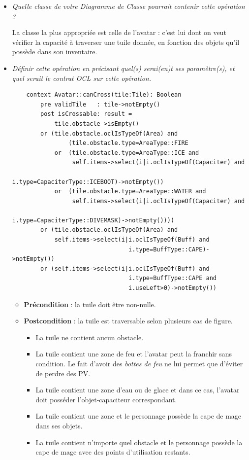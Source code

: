 \documentclass[oneside,a4paper]{book}
\begin{document}
\begin{itemize}
    \item \textit{Quelle classe de votre Diagramme de Classe pourrait contenir cette opération ?}
    
        La classe la plus appropriée est celle de l'avatar : c'est lui dont on veut vérifier la capacité à traverser une tuile donnée, en fonction des objets qu'il possède dans son inventaire.

    \item \textit{Définir cette opération en précisant quel(s) serai(en)t ses paramètre(s), et quel serait le contrat OCL sur cette opération.}

    \begin{minipage}{\linewidth}
    \begin{lstlisting}
    context Avatar::canCross(tile:Tile): Boolean
        pre validTile   : tile->notEmpty()
        post isCrossable: result = 
            tile.obstacle->isEmpty()
        or (tile.obstacle.oclIsTypeOf(Area) and
                (tile.obstacle.type=AreaType::FIRE
            or  (tile.obstacle.type=AreaType::ICE and
                 self.items->select(i|i.oclIsTypeOf(Capaciter) and
                                      i.type=CapaciterType::ICEBOOT)->notEmpty())
            or  (tile.obstacle.type=AreaType::WATER and
                 self.items->select(i|i.oclIsTypeOf(Capaciter) and
                                      i.type=CapaciterType::DIVEMASK)->notEmpty())))
        or (tile.obstacle.oclIsTypeOf(Area) and
            self.items->select(i|i.oclIsTypeOf(Buff) and
                                 i.type=BuffType::CAPE)->notEmpty())
        or (self.items->select(i|i.oclIsTypeOf(Buff) and
                                 i.type=BuffType::CAPE and
                                 i.useLeft>0)->notEmpty())
        \end{lstlisting}
    \end{minipage}
    \begin{itemize}
        \item \textbf{Précondition} : la tuile doit être non-nulle.
        \item \textbf{Postcondition} : la tuile est traversable selon plusieurs cas de figure.
        \begin{itemize}
            \item La tuile ne contient aucun obstacle.
            \item La tuile contient une zone de feu et l'avatar peut la franchir sans condition. Le fait d'avoir des \textit{bottes de feu} ne lui permet que d'éviter de perdre des PV.
            \item La tuile contient une zone d'eau ou de glace et dans ce cas, l'avatar doit posséder l'objet-capaciteur correspondant.
            \item La tuile contient une zone et le personnage possède la cape de mage dans ses objets.
            \item La tuile contient n'importe quel obstacle et le personnage possède la cape de mage avec des points d'utilisation restants.
        \end{itemize}
    \end{itemize}
    

\end{itemize}
\end{document}
